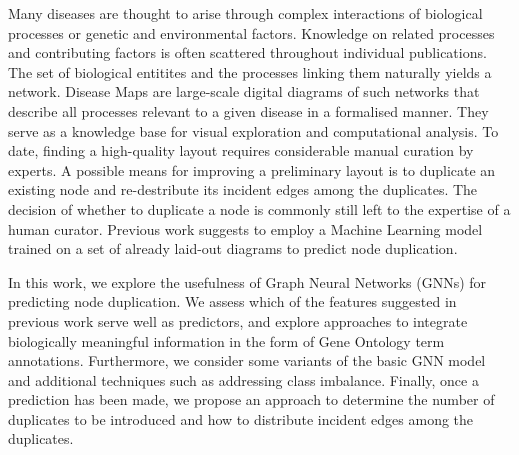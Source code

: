 \documentclass[
	fontsize=10pt, %
	twoside=false, %
	secnumdepth=1, %
  toc=indentunnumbered %
]{kaobook}
\begin{document}
Many diseases are thought to arise through complex interactions of biological
processes or genetic and environmental factors.
Knowledge on related processes and contributing factors
is often scattered throughout individual publications.
%
The set of biological entitites and the processes linking them naturally yields
a network.
Disease Maps are large-scale digital diagrams of such networks that
describe all processes relevant to a given disease in a formalised manner.
They serve as a
knowledge base for visual exploration and computational analysis.
%
To date, finding a high-quality layout requires considerable manual
curation by experts.
A possible means for improving a preliminary layout is to duplicate an
existing node and re-destribute its incident edges among the duplicates.
The decision of whether to duplicate a node is commonly still left to the
expertise of a human curator. Previous work
\cite{nielsen_MachineLearningSupport_2019} suggests to employ a Machine Learning
model trained on a set of already laid-out diagrams to predict node duplication.

In this work, we explore the usefulness of Graph Neural Networks (GNNs) for
predicting node duplication.
%
We assess which
of the features suggested in previous work
\cite{nielsen_MachineLearningSupport_2019} serve well as predictors,
%
and explore approaches to integrate biologically meaningful information in the
form of Gene Ontology term annotations.
%
Furthermore, we consider some variants of the basic GNN model and
additional techniques such as addressing class imbalance.
%
Finally, once a prediction has been made, we propose an approach to determine
the number of duplicates to be introduced and how to distribute incident edges
among the duplicates.
\end{document}
